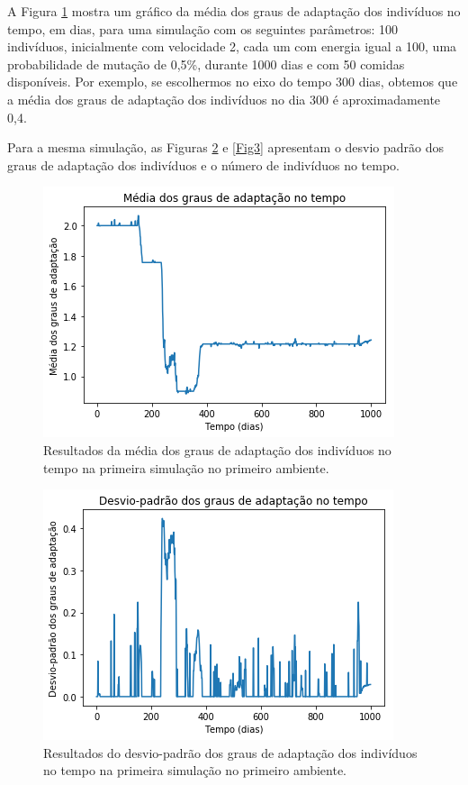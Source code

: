 \documentclass[10pt,brazil,english]{article}
\begin{document}
        A Figura \ref{Fig1} mostra um gráfico da média dos graus de adaptação dos indivíduos no tempo, em dias, para uma simulação com os seguintes parâmetros: 100 indivíduos, inicialmente com velocidade 2, cada um com energia igual a 100, uma probabilidade de mutação de 0,5\%, durante 1000 dias e com 50 comidas disponíveis. Por exemplo, se escolhermos no eixo do tempo 300 dias, obtemos que a média dos graus de adaptação dos indivíduos no dia 300 é aproximadamente 0,4.
        
        Para a mesma simulação, as Figuras \ref{Fig2} e \ref{Fig3} apresentam o desvio padrão dos graus de adaptação dos indivíduos e o número de indivíduos no tempo.
        
        \begin{figure}[!hbtp]
            \begin{center}
                \includegraphics[scale=0.5]{Images/1-1.png}
            \end{center}
            \caption{Resultados da média dos graus de adaptação dos indivíduos no tempo na primeira simulação no primeiro ambiente.}
            \label{Fig1}
        \end{figure} 
        
        \begin{figure}[!hbtp]
            \begin{center}
                \includegraphics[scale=0.5]{Images/1-2.png}
            \end{center}
            \caption{Resultados do desvio-padrão dos graus de adaptação dos indivíduos no tempo na primeira simulação no primeiro ambiente.}
            \label{Fig2}
        \end{figure} 
        
\end{document}
